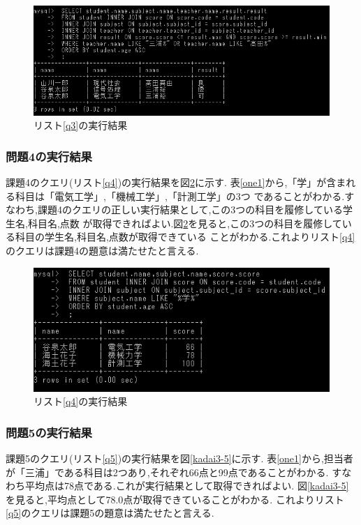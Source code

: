 \documentclass[a4j]{jarticle}
\begin{document}
    \begin{figure}[H]
      \centering
      \includegraphics[scale=1.2]{kadai3-3.png}
      \caption{リスト\ref{q3}の実行結果}
       \label{kadai3-3}
      \end{figure}

    \subsubsection{問題4の実行結果}
    課題4のクエリ(リスト\ref{q4})の実行結果を図\ref{kadai3-4}に示す.
    表\ref{one1}から,「学」が含まれる科目は「電気工学」,「機械工学」,「計測工学」の3つ
    であることがわかる.すなわち,課題4のクエリの正しい実行結果として,この3つの科目を履修している学生名,科目名,点数
    が取得できればよい.図\ref{kadai3-4}を見ると,この3つの科目を履修している科目の学生名,科目名,点数が取得できている
    ことがわかる.これよりリスト\ref{q4}のクエリは課題4の題意は満たせたと言える.

    \begin{figure}[H]
      \centering
      \includegraphics[scale=1.2]{kadai3-4.png}
      \caption{リスト\ref{q4}の実行結果}
       \label{kadai3-4}
      \end{figure}

    \subsubsection{問題5の実行結果}
    課題5のクエリ(リスト\ref{q5})の実行結果を図\ref{kadai3-5}に示す.
    表\ref{one1}から,担当者が「三浦」である科目は2つあり,それぞれ66点と99点であることがわかる.
    すなわち平均点は78点である.これが実行結果として取得できればよい.
    図\ref{kadai3-5}を見ると,平均点として78.0点が取得できていることがわかる.
    これよりリスト\ref{q5}のクエリは課題5の題意は満たせたと言える.
\end{document}
